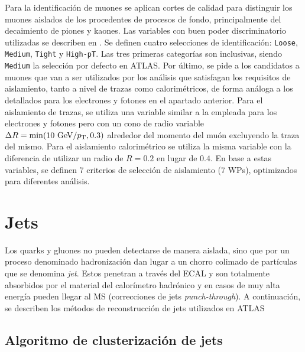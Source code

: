Para la identificación de muones se aplican cortes de calidad para distinguir los muones aislados de los procedentes de procesos de fondo, principalmente del decaimiento de piones y kaones.
Las variables con buen poder discriminatorio utilizadas se describen en . Se definen cuatro selecciones de identificación: \texttt{Loose}, \texttt{Medium}, \texttt{Tight} y \texttt{High-pT}. Las tres primeras categorías son inclusivas, siendo \texttt{Medium} la selección por defecto en \ac{ATLAS}. Por último, se pide a los candidatos a muones que van a ser utilizados por los análisis que satisfagan los requisitos de aislamiento, tanto a nivel de trazas como calorimétricos, de forma análoga a los detallados para los electrones y fotones en el apartado anterior. Para el aislamiento de trazas, se utiliza una variable similar a la empleada para los electrones y fotones pero con un cono de radio variable \(\Delta R = \min(10~\text{GeV}/p_{\text{T}}, 0.3)\) alrededor del momento del muón excluyendo la traza del mismo. Para el aislamiento calorimétrico se utiliza la misma variable \etconefo con la diferencia de utilizar un radio de \(R=0.2\) en lugar de \(0.4\). En base a estas variables, se definen 7 criterios de selección de aislamiento (7 \acp{WP}), optimizados para diferentes análisis.








\section{Jets}
\label{sec:objects:jets}

Los quarks y gluones no pueden detectarse de manera aislada, sino que por un proceso denominado hadronización dan lugar a un chorro colimado de partículas que se denomina \textit{jet}. Estos penetran a través del \ac{ECAL} y son totalmente absorbidos por el material del calorímetro hadrónico y en casos de muy alta energía pueden llegar al \ac{MS} (correcciones de jets \textit{punch-through}). A continuación, se describen los métodos de reconstrucción de jets utilizados en \ac{ATLAS}

\subsection{Algoritmo de clusterización de jets \texorpdfstring{\antikt}{Anti-kT}}

